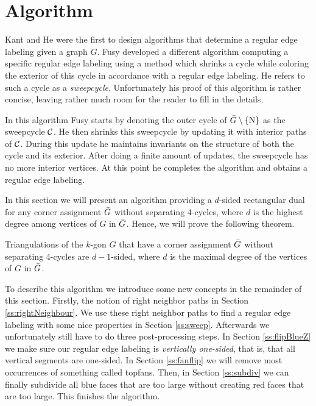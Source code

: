 
\section{Algorithm}
\thispagestyle{plain}
\label{s:algo}

  Kant and He \cite{Kant1997} were the first to design algorithms that determine a regular edge labeling given a graph $G$. Fusy \cite{Fusy2006} developed a different algorithm computing a specific regular edge labeling using a method which shrinks a cycle while coloring the exterior of this cycle in accordance with a regular edge labeling.
  He refers to such a cycle as a \emph{sweepcycle}.
  Unfortunately his proof of this algorithm is rather concise, leaving rather much room for the reader to fill in the details.

  In this algorithm Fusy starts by denoting the outer cycle of $\bar{G} \setminus \left\lbrace {\mathrm{N}} \right\rbrace$ as the sweepcycle $\mathcal{C}$. He then shrinks this sweepcycle by updating it with interior paths of $\mathcal{C}$. During this update he maintains invariants on the structure of both the cycle and its exterior.
  After doing a finite amount of updates, the sweepcycle has no more interior vertices. At this point he completes the algorithm and obtains a regular edge labeling.

  In this section we will present an algorithm providing a $d$-sided rectangular dual for any corner assignment $\bar{G}$ without separating $4$-cycles, where $d$ is the highest degree among vertices of $G$ in $\bar{G}$.  Hence, we will prove the following theorem.

  \begin{thrm}
  \label{th:dsided}
  Triangulations of the $k$-gon $G$ that have a corner assignment $\bar{G}$ without separating 4-cycles are $d-1$-sided, where $d$ is the maximal degree of the vertices of $G$ in $\bar{G}$.
  \end{thrm}

  To describe this algorithm we introduce some new concepts in the remainder of this section. Firstly, the notion of right neighbor paths in Section \ref{ss:rightNeighbour}.  We use these right neighbor paths to find a regular edge labeling with some nice properties in Section \ref{ss:sweep}. Afterwards we unfortunately still have to do three post-processing steps. In Section \ref{ss:flipBlueZ} we make sure our regular edge labeling is \emph{vertically one-sided}, that is, that all vertical segments are one-sided. In Section \ref{ss:fanflip} we will remove most occurrences of something called topfans. Then, in Section \ref{ss:subdiv} we can finally subdivide all blue faces that are too large without creating red faces that are too large. This finishes the algorithm.
